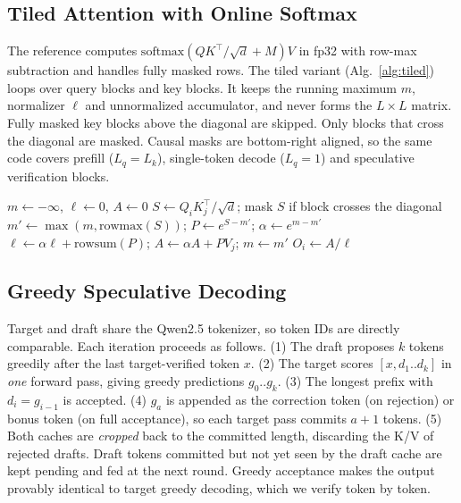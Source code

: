 \documentclass[conference]{IEEEtran}
\begin{document}
\subsection{Tiled Attention with Online Softmax}
The reference computes $\mathrm{softmax}(QK^\top/\sqrt d+M)V$ in fp32 with row-max subtraction and
handles fully masked rows. The tiled variant (Alg.~\ref{alg:tiled}) loops over query blocks and key
blocks. It keeps the running maximum $m$, normalizer $\ell$ and unnormalized accumulator, and never
forms the $L\times L$ matrix. Fully masked key blocks above the diagonal are skipped. Only blocks that
cross the diagonal are masked. Causal masks are bottom-right aligned, so the same code covers prefill
($L_q=L_k$), single-token decode ($L_q=1$) and speculative verification blocks.

\begin{algorithm}[t]\caption{Tiled causal attention with online softmax}\label{alg:tiled}
\begin{algorithmic}[1]\scriptsize
{}
 \State $m\gets-\infty$, $\ell\gets0$, $A\gets0$
  \State $S\gets Q_iK_j^\top/\sqrt d$; mask $S$ if block crosses the diagonal
  \State $m'\gets\max(m,\mathrm{rowmax}(S))$; $P\gets e^{S-m'}$; $\alpha\gets e^{m-m'}$
  \State $\ell\gets\alpha\ell+\mathrm{rowsum}(P)$; $A\gets\alpha A+PV_j$; $m\gets m'$
 \EndFor
 \State $O_i\gets A/\ell$
\EndFor
\end{algorithmic}\end{algorithm}

\subsection{Greedy Speculative Decoding}\label{sec:specmethod}
Target and draft share the Qwen2.5 tokenizer, so token IDs are directly comparable. Each iteration
proceeds as follows. (1) The draft proposes $k$ tokens greedily after the last target-verified token $x$.
(2) The target scores $[x,d_1..d_k]$ in \emph{one} forward pass, giving greedy predictions $g_0..g_k$.
(3) The longest prefix with $d_i=g_{i-1}$ is accepted. (4) $g_a$ is appended as the correction token
(on rejection) or bonus token (on full acceptance), so each target pass commits $a+1$ tokens.
(5) Both caches are \emph{cropped} back to the committed length, discarding the K/V of rejected
drafts. Draft tokens committed but not yet seen by the draft cache are kept pending and fed at the next
round. Greedy acceptance makes the output provably identical to target greedy decoding, which we verify
token by token.
\end{document}
